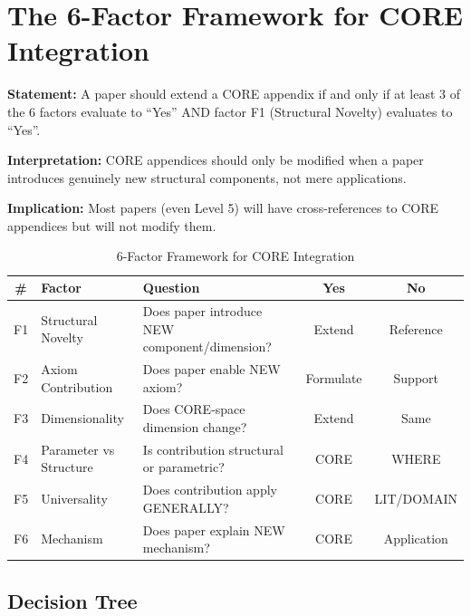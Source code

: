 \section{The 6-Factor Framework for CORE Integration}
\label{sec:paperint-6factor}

\begin{tcolorbox}[colback=gray!5!white, colframe=gray!75!black,
    title=Axiom PINT-4: CORE Integration Decision]
\textbf{Statement:} A paper should extend a CORE appendix if and only if
at least 3 of the 6 factors evaluate to ``Yes'' AND factor F1 (Structural Novelty)
evaluates to ``Yes''.

\textbf{Interpretation:} CORE appendices should only be modified when
a paper introduces genuinely new structural components, not mere applications.

\textbf{Implication:} Most papers (even Level 5) will have cross-references
to CORE appendices but will not modify them.
\end{tcolorbox}

\begin{table}[htbp]
\centering
\caption{6-Factor Framework for CORE Integration}
\label{tab:6-factor}
\renewcommand{\arraystretch}{1.3}
\begin{tabular}{@{}clp{5cm}cc@{}}
\toprule
\textbf{\#} & \textbf{Factor} & \textbf{Question} & \textbf{Yes} & \textbf{No} \\
\midrule
F1 & Structural Novelty & Does paper introduce NEW component/dimension? & Extend & Reference \\
F2 & Axiom Contribution & Does paper enable NEW axiom? & Formulate & Support \\
F3 & Dimensionality & Does CORE-space dimension change? & Extend & Same \\
F4 & Parameter vs Structure & Is contribution structural or parametric? & CORE & WHERE \\
F5 & Universality & Does contribution apply GENERALLY? & CORE & LIT/DOMAIN \\
F6 & Mechanism & Does paper explain NEW mechanism? & CORE & Application \\
\bottomrule
\end{tabular}
\end{table}

\subsection{Decision Tree}

